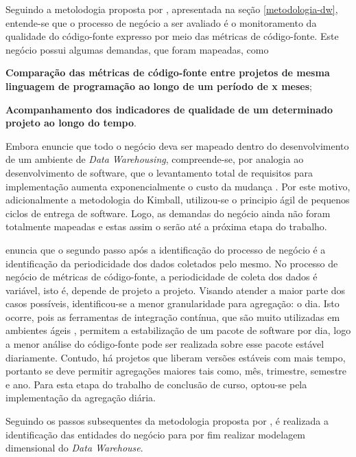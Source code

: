 Seguindo a metolodogia proposta por , apresentada na seção \ref{metodologia-dw}, entende-se que o processo de negócio a ser avaliado é o monitoramento da qualidade do código-fonte expresso por meio das métricas de código-fonte. Este negócio possui algumas demandas, que foram mapeadas, como \begin{inparaenum}[i)] \item 
\textbf{Comparação das métricas de código-fonte entre projetos de mesma linguagem de programação ao longo de um período de x meses}; \item \textbf{Acompanhamento dos indicadores de qualidade de um determinado projeto ao longo do tempo}.
\end{inparaenum} 
Embora  enuncie que todo o negócio deva ser mapeado dentro do desenvolvimento de um ambiente de \textit{Data Warehousing}, compreende-se, por analogia ao desenvolvimento de software, que o levantamento total de requisitos para implementação aumenta exponencialmente o custo da mudança \cite{beck1999}. Por este motivo, adicionalmente a metodologia do Kimball, utilizou-se o principio ágil de pequenos ciclos de entrega de software. Logo, as demandas do negócio ainda não foram totalmente mapeadas e estas assim o serão até a próxima etapa do trabalho.


 enuncia que o segundo passo após a identificação do processo de negócio é a identificação da periodicidade dos dados coletados pelo mesmo. No processo de negócio de métricas de código-fonte, a periodicidade de coleta dos dados é variável, isto é, depende de projeto a projeto. Visando atender a maior parte dos casos possíveis, identificou-se a menor granularidade para agregação: o dia. Isto ocorre, pois as ferramentas de integração contínua, que são muito utilizadas em ambientes ágeis \cite{beckarticle1999}, permitem a estabilização de um pacote de software por dia, logo a menor análise do código-fonte pode ser realizada sobre esse pacote estável diariamente. Contudo, há projetos que liberam versões estáveis com mais tempo, portanto se deve permitir agregações maiores tais como, mês, trimestre, semestre e ano. Para esta etapa do trabalho de conclusão de curso, optou-se pela implementação da agregação diária.


Seguindo os passos subsequentes da metodologia proposta por , é realizada a identificação das entidades do negócio para por fim realizar modelagem dimensional do \textit{Data Warehouse}. 


